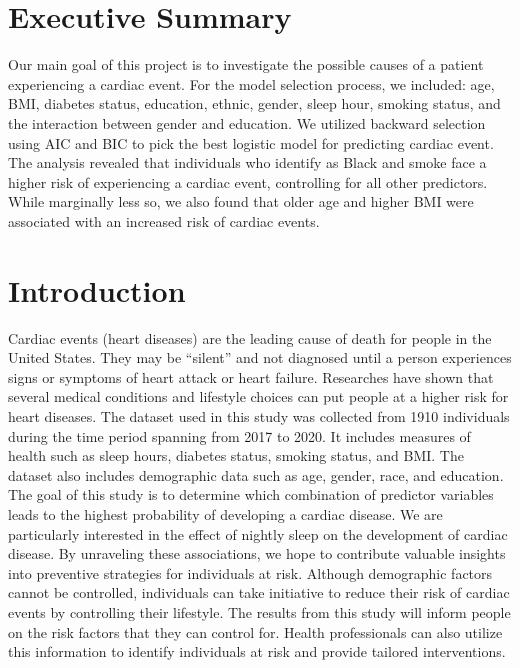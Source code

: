 \documentclass[12pt]{article}
\begin{document}
\section*{Executive Summary}
Our main goal of this project is to investigate the possible causes of a patient experiencing a cardiac event. For the model selection process, we included: age, BMI, diabetes status, education, ethnic, gender, sleep hour, smoking status, and the interaction between gender and education. We utilized backward selection using AIC and BIC to pick the best logistic model for predicting cardiac event. The analysis revealed that individuals who identify as Black and smoke face a higher risk of experiencing a cardiac event, controlling for all other predictors. While marginally less so, we also found that older age and higher BMI were associated with an increased risk of cardiac events. 

\section*{Introduction}
Cardiac events (heart diseases) are the leading cause of death for people in the United States. They may be “silent” and not diagnosed until a person experiences signs or symptoms of heart attack or heart failure. Researches have shown that several medical conditions and lifestyle choices can put people at a higher risk for heart diseases. The dataset used in this study was collected from 1910 individuals during the time period spanning from 2017 to 2020. It includes measures of health such as sleep hours, diabetes status, smoking status, and BMI. The dataset also includes demographic data such as age, gender, race, and education. \\

The goal of this study is to determine which combination of predictor variables leads to the highest probability of developing a cardiac disease. We are particularly interested in the effect of nightly sleep on the development of cardiac disease. By unraveling these associations, we hope to contribute valuable insights into preventive strategies for individuals at risk. Although demographic factors cannot be controlled, individuals can take initiative to reduce their risk of cardiac events by controlling their lifestyle. The results from this study will inform people on the risk factors that they can control for. Health professionals can also utilize this information to identify individuals at risk and provide tailored interventions. \\
\end{document}
